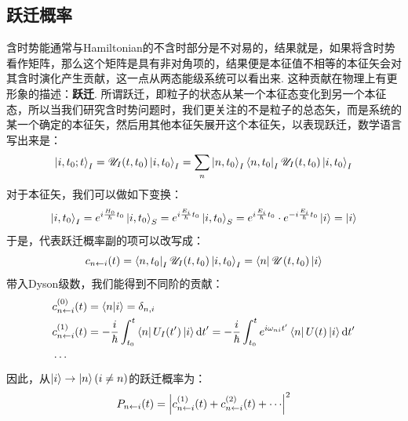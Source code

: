 \subsection{跃迁概率}
含时势能通常与Hamiltonian的不含时部分是不对易的，结果就是，如果将含时势看作矩阵，那么这个矩阵是具有非对角项的，结果便是本征值不相等的本征矢会对其含时演化产生贡献，这一点从两态能级系统可以看出来. 这种贡献在物理上有更形象的描述：\textbf{跃迁}. 所谓跃迁，即粒子的状态从某一个本征态变化到另一个本征态，所以当我们研究含时势问题时，我们更关注的不是粒子的总态矢，而是系统的某一个确定的本征矢，然后用其他本征矢展开这个本征矢，以表现跃迁，数学语言写出来是：
\[
\ket{i,t_{0};t}_{I} = \mathscr{U}_{I}(t,t_{0})\ket{i,t_{0}}_{I} = \sum_{n}\ket{n,t_{0}}_{I}\bra{n,t_{0}}_{I}\mathscr{U}_{I}(t,t_{0})\ket{i,t_{0}}_{I}
\]
对于本征矢，我们可以做如下变换：
\[
\ket{i,t_{0}}_{I} = e^{i\frac{H_{0}}{\hbar}t_{0}}\ket{i,t_{0}}_{S} = e^{i\frac{E_{i}}{\hbar}t_{0}}\ket{i,t_{0}}_{S} = e^{i\frac{E_{i}}{\hbar}t_{0}}\cdot e^{-i\frac{E_{i}}{\hbar}t_{0}}\ket{i} = \ket{i}
\]
于是，代表跃迁概率副的项可以改写成：
\[
c_{n\leftarrow i}(t) = \bra{n,t_{0}}_{I}\mathscr{U}_{I}(t,t_{0})\ket{i,t_{0}}_{I} = \bra{n}\mathscr{U}(t,t_{0})\ket{i}
\]
带入Dyson级数，我们能得到不同阶的贡献：
\begin{align*}
& c_{{n}\leftarrow{i}}^{(0)}(t) = \bra{n}\ket{i} = \delta_{n,i} \\
& c_{{n}\leftarrow{i}}^{(1)}(t) = -\frac{i}{\hbar}\int_{t_{0}}^{t}\bra{n}U_{I}(t')\ket{i}\dd{t}' = -\frac{i}{\hbar}\int_{t_{0}}^{t}e^{i\omega_{ni}t'}\bra{n}U(t)\ket{i}\dd{t'} \\
& \cdots 
\end{align*}
因此，从\(\ket{i}\to\ket{n}(i\neq n)\)的跃迁概率为：
\[
P_{{n}\leftarrow{i}}(t) = \abs{c_{{n}\leftarrow{i}}^{(1)}(t) + c_{{n}\leftarrow{i}}^{(2)}(t) + \cdots}^{2}
\]
